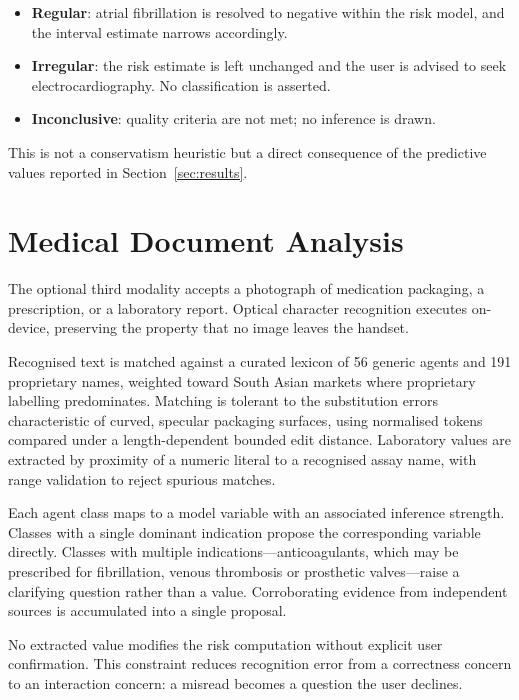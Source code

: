 \documentclass[conference]{IEEEtran}
\begin{document}
\begin{itemize}
\item \textbf{Regular}: atrial fibrillation is resolved to negative within the risk
      model, and the interval estimate narrows accordingly.
\item \textbf{Irregular}: the risk estimate is left unchanged and the user is
      advised to seek electrocardiography. No classification is asserted.
\item \textbf{Inconclusive}: quality criteria are not met; no inference is drawn.
\end{itemize}

This is not a conservatism heuristic but a direct consequence of the predictive
values reported in Section~\ref{sec:results}.

\section{Medical Document Analysis}

The optional third modality accepts a photograph of medication packaging, a
prescription, or a laboratory report. Optical character recognition executes
on-device, preserving the property that no image leaves the handset.

Recognised text is matched against a curated lexicon of 56 generic agents and 191
proprietary names, weighted toward South Asian markets where proprietary labelling
predominates. Matching is tolerant to the substitution errors characteristic of
curved, specular packaging surfaces, using normalised tokens compared under a
length-dependent bounded edit distance. Laboratory values are extracted by
proximity of a numeric literal to a recognised assay name, with range validation
to reject spurious matches.

Each agent class maps to a model variable with an associated inference strength.
Classes with a single dominant indication propose the corresponding variable
directly. Classes with multiple indications---anticoagulants, which may be
prescribed for fibrillation, venous thrombosis or prosthetic valves---raise a
clarifying question rather than a value. Corroborating evidence from independent
sources is accumulated into a single proposal.

No extracted value modifies the risk computation without explicit user
confirmation. This constraint reduces recognition error from a correctness concern
to an interaction concern: a misread becomes a question the user declines.
\end{document}
